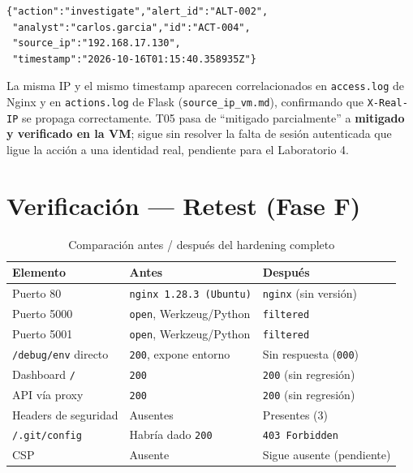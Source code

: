 \documentclass[journal]{IEEEtran}
\begin{document}
\begin{lstlisting}[caption={Respuesta de /api/actions/actions (source\_ip\_vm.md)}]
{"action":"investigate","alert_id":"ALT-002",
 "analyst":"carlos.garcia","id":"ACT-004",
 "source_ip":"192.168.17.130",
 "timestamp":"2026-10-16T01:15:40.358935Z"}
\end{lstlisting}

La misma IP y el mismo timestamp aparecen correlacionados en
\texttt{access.log} de Nginx y en \texttt{actions.log} de Flask
(\texttt{source\_ip\_vm.md}), confirmando que \texttt{X-Real-IP} se propaga
correctamente. T05 pasa de ``mitigado parcialmente'' a \textbf{mitigado y
verificado en la VM}; sigue sin resolver la falta de sesión autenticada que
ligue la acción a una identidad real, pendiente para el Laboratorio 4.

\section{Verificación --- Retest (Fase F)}
\label{sec:retest}

\begin{table}[H]
\centering
\caption{Comparación antes / después del hardening completo}
\label{tab:retest-final}
\scriptsize
\renewcommand{\arraystretch}{1.2}
\begin{tabular}{|p{2.2cm}|p{2.1cm}|p{2.1cm}|}
\hline
\textbf{Elemento} & \textbf{Antes} & \textbf{Después} \\
\hline
Puerto 80 & \texttt{nginx 1.28.3 (Ubuntu)} & \texttt{nginx} (sin versión) \\
\hline
Puerto 5000 & \texttt{open}, Werkzeug/Python & \texttt{filtered} \\
\hline
Puerto 5001 & \texttt{open}, Werkzeug/Python & \texttt{filtered} \\
\hline
\texttt{/debug/env} directo & \texttt{200}, expone entorno & Sin respuesta (\texttt{000}) \\
\hline
Dashboard \texttt{/} & \texttt{200} & \texttt{200} (sin regresión) \\
\hline
API vía proxy & \texttt{200} & \texttt{200} (sin regresión) \\
\hline
Headers de seguridad & Ausentes & Presentes (3) \\
\hline
\texttt{/.git/config} & Habría dado \texttt{200} & \texttt{403 Forbidden} \\
\hline
CSP & Ausente & Sigue ausente (pendiente) \\
\hline
\end{tabular}
\end{table}
\end{document}

